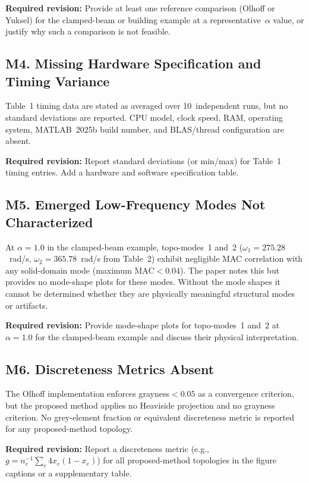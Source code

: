 \documentclass[11pt,a4paper]{article}
\begin{document}
\textbf{Required revision:} Provide at least one reference comparison (Olhoff or Yuksel)
for the clamped-beam or building example at a representative~$\alpha$ value, or justify
why such a comparison is not feasible.

\subsection*{M4.\; Missing Hardware Specification and Timing Variance}

Table~1 timing data are stated as averaged over 10~independent runs, but no standard
deviations are reported. CPU model, clock speed, RAM, operating system, MATLAB~2025b
build number, and BLAS/thread configuration are absent.

\textbf{Required revision:} Report standard deviations (or min/max) for Table~1 timing
entries. Add a hardware and software specification table.

\subsection*{M5.\; Emerged Low-Frequency Modes Not Characterized}

At $\alpha=1.0$ in the clamped-beam example, topo-modes~1 and~2
($\omega_1=275.28$~rad/s, $\omega_2=365.78$~rad/s from Table~2) exhibit negligible MAC
correlation with any solid-domain mode (maximum MAC$<0.04$). The paper notes this but
provides no mode-shape plots for these modes. Without the mode shapes it cannot be
determined whether they are physically meaningful structural modes or artifacts.

\textbf{Required revision:} Provide mode-shape plots for topo-modes~1 and~2 at
$\alpha=1.0$ for the clamped-beam example and discuss their physical interpretation.

\subsection*{M6.\; Discreteness Metrics Absent}

The Olhoff implementation enforces grayness${}<0.05$ as a convergence criterion, but the
proposed method applies no Heaviside projection and no grayness criterion. No
grey-element fraction or equivalent discreteness metric is reported for any
proposed-method topology.

\textbf{Required revision:} Report a discreteness metric
(e.g.,~$g = n_e^{-1}\sum_e 4x_e(1-x_e)$) for all proposed-method topologies in the
figure captions or a supplementary table.
\end{document}
